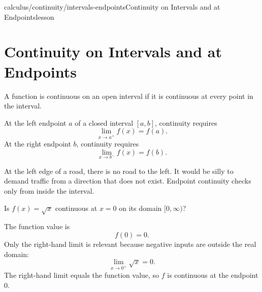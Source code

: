 \begin{webpage}{calculus/continuity/intervals-endpoints}{Continuity on Intervals and at Endpoints}{lesson}
\section{Continuity on Intervals and at Endpoints}


A function is continuous on an open interval if it is continuous at every point in the interval.

At the left endpoint \(a\) of a closed interval \([a,b]\), continuity requires
\[
  \lim_{x\to a^+}f(x)=f(a).
\]
At the right endpoint \(b\), continuity requires
\[
  \lim_{x\to b^-}f(x)=f(b).
\]

\begin{bgconcept}
At the left edge of a road, there is no road to the left. It would be silly to demand traffic from a direction that does not exist. Endpoint continuity checks only from inside the interval.
\end{bgconcept}

\begin{bgguided}[title={Square root at its endpoint}]
Is \(f(x)=\sqrt{x}\) continuous at \(x=0\) on its domain \([0,\infty)\)?

\begin{bgsolution}
The function value is
\[
  f(0)=0.
\]
Only the right-hand limit is relevant because negative inputs are outside the real domain:
\[
  \lim_{x\to0^+}\sqrt{x}=0.
\]
The right-hand limit equals the function value, so \(f\) is continuous at the endpoint \(0\).
\end{bgsolution}
\end{bgguided}
\end{webpage}

